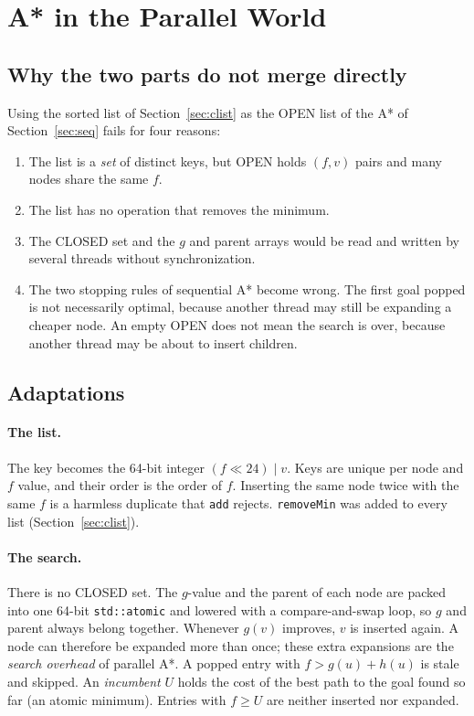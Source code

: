 \section{A* in the Parallel World}
\label{sec:par}

\subsection{Why the two parts do not merge directly}

Using the sorted list of Section~\ref{sec:clist} as the OPEN list of the A* of
Section~\ref{sec:seq} fails for four reasons:

\begin{enumerate}[nosep]
  \item The list is a \emph{set} of distinct keys, but OPEN holds $(f, v)$
        pairs and many nodes share the same $f$.
  \item The list has no operation that removes the minimum.
  \item The CLOSED set and the $g$ and parent arrays would be read and written
        by several threads without synchronization.
  \item The two stopping rules of sequential A* become wrong. The first goal
        popped is not necessarily optimal, because another thread may still be
        expanding a cheaper node. An empty OPEN does not mean the search is
        over, because another thread may be about to insert children.
\end{enumerate}

\subsection{Adaptations}\label{sec:par-adapt}

\paragraph{The list.} The key becomes the 64-bit integer $(f \ll 24) \mid v$.
Keys are unique per node and $f$ value, and their order is the order of $f$.
Inserting the same node twice with the same $f$ is a harmless duplicate that
\texttt{add} rejects. \texttt{removeMin} was added to every list
(Section~\ref{sec:clist}).

\paragraph{The search.} There is no CLOSED set. The $g$-value and the parent of
each node are packed into one 64-bit \texttt{std::atomic} and lowered with a
compare-and-swap loop, so $g$ and parent always belong together. Whenever
$g(v)$ improves, $v$ is inserted again. A node can therefore be expanded more
than once; these extra expansions are the \emph{search overhead} of parallel
A*. A popped entry with $f > g(u) + h(u)$ is stale and skipped. An
\emph{incumbent} $U$ holds the cost of the best path to the goal found so far
(an atomic minimum). Entries with $f \ge U$ are neither inserted nor expanded.

